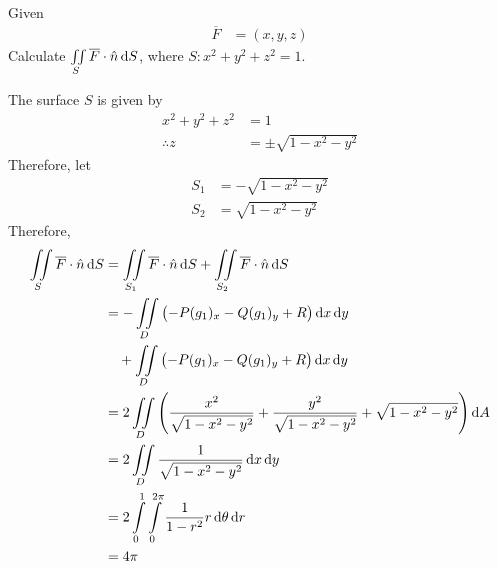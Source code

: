 \documentclass[fleqn, a4paper, 8pt, twoside]{amsart}
\theoremstyle{definition}
\theoremstyle{bluedefinition}
\theoremstyle{redtheorem}
\begin{document}
\begin{multicols}{2}
\begin{spacing}{0.7}
\begin{question}
	Given
	\begin{align*}
		\overline{F} & = (x,y,z)
	\end{align*}
	Calculate $\iint\limits_{S} \overline{F} \cdot \hat{n} \dif S$, where $S : x^2 + y^2 + z^2 = 1$.
\end{question}

\begin{solution}
	The surface $S$ is given by
	\begin{align*}
		x^2 + y^2 + z^2 & = 1 \\
		\therefore z    & = \pm \sqrt{1 - x^2 - y^2}
	\end{align*}
	Therefore, let
	\begin{align*}
		S_1 & = -\sqrt{1 - x^2 - y^2} \\
		S_2 & = \sqrt{1 - x^2 - y^2}
	\end{align*}
	Therefore,
	\begin{align*}
		\iint\limits_{S} \overline{F} \cdot \hat{n} \dif S & = \iint\limits_{S_1} \overline{F} \cdot \hat{n} \dif S + \iint\limits_{S_2} \overline{F} \cdot \hat{n} \dif S                         \\
                                                                   & = -\iint\limits_{D} \left( -P (g_1)_x - Q (g_1)_y + R \right) \dif x \dif y                                                           \\
                                                                   & \quad + \iint\limits_{D} \left( -P (g_1)_x - Q (g_1)_y + R \right) \dif x \dif y                                                      \\
                                                                   & = 2 \iint\limits_{D} \left( \frac{x^2}{\sqrt{1 - x^2 - y^2}} + \frac{y^2}{\sqrt{1 - x^2 - y^2}} + \sqrt{1 - x^2 - y^2} \right) \dif A \\
                                                                   & = 2 \iint\limits_{D} \frac{1}{\sqrt{1 - x^2 - y^2}} \dif x \dif y                                                                     \\
                                                                   & = 2 \int\limits_{0}^{1} \int\limits_{0}^{2 \pi} \frac{1}{1 - r^2} r \dif \theta \dif r                                                \\
                                                                   & = 4 \pi
	\end{align*}
\end{solution}


\end{spacing}
\end{multicols}
\end{document}
